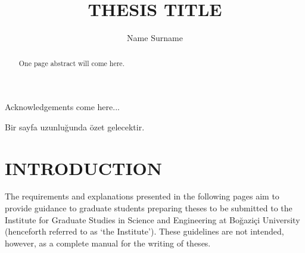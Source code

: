 \documentclass[a4paper,oneside,12pt]{report}
\title{THESIS TITLE}
\author{Name Surname}
\numberwithin{equation}{chapter}
\begin{document}
\makemstitle %
\makeapprovalpage

\begin{acknowledgements}
Acknowledgements come here...
\end{acknowledgements}

\begin{abstract}
One page abstract will come here.  
\end{abstract}

\begin{ozet}
Bir sayfa uzunluğunda özet gelecektir.
\end{ozet}

\tableofcontents
\listoffigures
\listoftables

\begin{symbols}
\sym{}{}
\sym{ }{}
\end{symbols}

\begin{abbreviations}
\end{abbreviations}



\chapter{INTRODUCTION}
\label{chapter:introduction}

The requirements and explanations presented in the following pages aim to
provide guidance to graduate students preparing theses to be submitted to the Institute for
Graduate Studies in Science and Engineering at Bo\u{g}azi\c{c}i
University (henceforth referred to as `the Institute'). These guidelines are not intended, however, as a
complete manual for the writing of theses.
\end{document}
